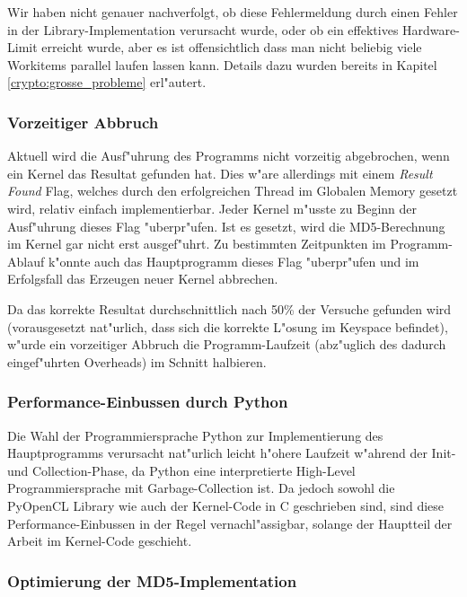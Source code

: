 \begin{refsection}
Wir haben nicht genauer nachverfolgt, ob diese Fehlermeldung durch einen Fehler
in der Library-Implementation verursacht wurde, oder ob ein effektives
Hardware-Limit erreicht wurde, aber es ist offensichtlich dass man nicht
beliebig viele Workitems parallel laufen lassen kann. Details dazu wurden
bereits in Kapitel \ref{crypto:grosse_probleme} erl"autert.

\subsubsection{Vorzeitiger Abbruch}

Aktuell wird die Ausf"uhrung des Programms nicht vorzeitig abgebrochen, wenn ein
Kernel das Resultat gefunden hat. Dies w"are allerdings mit einem \textit{Result
Found} Flag, welches durch den erfolgreichen Thread im Globalen Memory gesetzt
wird, relativ einfach implementierbar. Jeder Kernel m"usste zu Beginn der
Ausf"uhrung dieses Flag "uberpr"ufen. Ist es gesetzt, wird die MD5-Berechnung im
Kernel gar nicht erst ausgef"uhrt. Zu bestimmten Zeitpunkten im Programm-Ablauf
k"onnte auch das Hauptprogramm dieses Flag "uberpr"ufen und im Erfolgsfall das
Erzeugen neuer Kernel abbrechen.

Da das korrekte Resultat durchschnittlich nach 50\% der Versuche gefunden wird
(vorausgesetzt nat"urlich, dass sich die korrekte L"osung im Keyspace befindet),
w"urde ein vorzeitiger Abbruch die Programm-Laufzeit (abz"uglich des dadurch
eingef"uhrten Overheads) im Schnitt halbieren.

\subsubsection{Performance-Einbussen durch Python}

Die Wahl der Programmiersprache Python zur Implementierung des Hauptprogramms
verursacht nat"urlich leicht h"ohere Laufzeit w"ahrend der Init- und
Collection-Phase, da Python eine interpretierte High-Level Programmiersprache
mit Garbage-Collection ist. Da jedoch sowohl die PyOpenCL Library wie auch der
Kernel-Code in C geschrieben sind, sind diese Performance-Einbussen in der Regel
vernachl"assigbar, solange der Hauptteil der Arbeit im Kernel-Code geschieht.

\subsubsection{Optimierung der MD5-Implementation}


\end{refsection}

